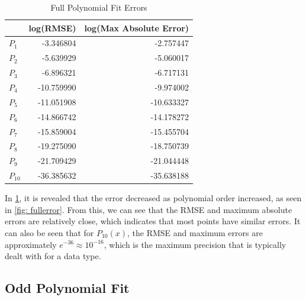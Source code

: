 \documentclass[10pt,a4paper]{article}
\begin{document}
\begin{multicols*}{2}
\begin{table}[H]
\begin{tabular}{l|rr}
\multicolumn{1}{l|}{} & \multicolumn{1}{c}{log(RMSE)} & \multicolumn{1}{c}{log(Max Absolute Error)} \\ \hline
$P_1$                  & -3.346804                     & -2.757447                                  \\
$P_2$                  & -5.639929                     & -5.060017                                   \\
$P_3$                  & -6.896321                     & -6.717131                                   \\
$P_4$                  & -10.759990                    & -9.974002                                    \\
$P_5$                  & -11.051908                    & -10.633327                                  \\
$P_6$                  & -14.866742                    & -14.178272                                  \\
$P_7$                  & -15.859004                    & -15.455704                                 \\
$P_8$                  & -19.275090                    & -18.750739                                \\
$P_9$                  & -21.709429                    & -21.044448                                 \\
$P_{10}$                 & -36.385632                    & -35.638188                                
\end{tabular}
\caption{Full Polynomial Fit Errors}
\label{table: fullerrors}
\end{table}

In \cref{table: fullerrors}, it is revealed that the error decreased as polynomial order increased, as seen in \cref{fig: fullerror}. From this, we can see that the RMSE and maximum absolute errors are relatively close, which indicates that most points have similar errors. It can also be seen that for $P_{10}(x)$, the RMSE and maximum errors are approximately $e^{-36} \approx 10^{-16}$, which is the maximum precision that is typically dealt with for a data type.

\subsection*{Odd Polynomial Fit}


\end{multicols*}
\end{document}
